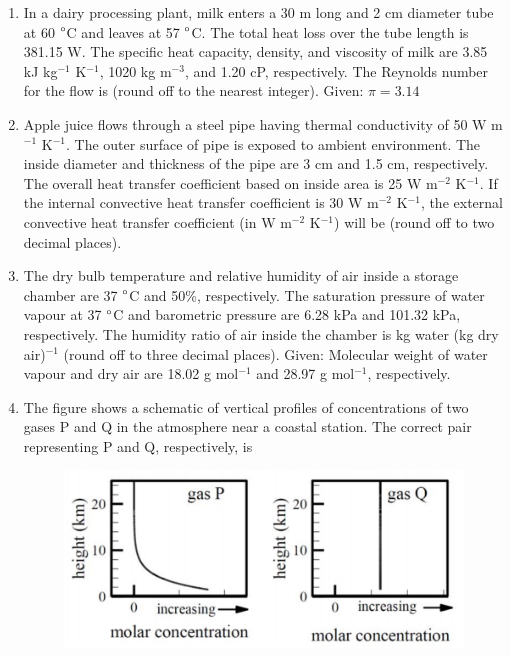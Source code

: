 \documentclass[a4paper,10pt]{article}
\begin{document}
\begin{enumerate}
\item In a dairy processing plant, milk enters a 30 m long and 2 cm diameter tube at 60 $\degree$C and leaves at 57 $\degree$C. The total heat loss over the tube length is 381.15 W. The specific heat capacity, density, and viscosity of milk are 3.85 kJ kg$^{-1}$ K$^{-1}$, 1020 kg m$^{-3}$, and 1.20 cP, respectively. The Reynolds number for the flow is \underline{\hspace{2cm}} (round off to the nearest integer). Given: $\pi = 3.14$

\hfill{}

\item Apple juice flows through a steel pipe having thermal conductivity of 50 W m$^{-1}$ K$^{-1}$. The outer surface of pipe is exposed to ambient environment. The inside diameter and thickness of the pipe are 3 cm and 1.5 cm, respectively. The overall heat transfer coefficient based on inside area is 25 W m$^{-2}$ K$^{-1}$. If the internal convective heat transfer coefficient is 30 W m$^{-2}$ K$^{-1}$, the external convective heat transfer coefficient (in W m$^{-2}$ K$^{-1}$) will be \underline{\hspace{2cm}} (round off to two decimal places).

\hfill{}

\item The dry bulb temperature and relative humidity of air inside a storage chamber are 37 $\degree$C and 50\%, respectively. The saturation pressure of water vapour at 37 $\degree$C and barometric pressure are 6.28 kPa and 101.32 kPa, respectively. The humidity ratio of air inside the chamber is \underline{\hspace{2cm}} kg water (kg dry air)$^{-1}$ (round off to three decimal places). Given: Molecular weight of water vapour and dry air are 18.02 g mol$^{-1}$ and 28.97 g mol$^{-1}$, respectively.

\hfill{}

\item The figure shows a schematic of vertical profiles of concentrations of two gases P and Q in the atmosphere near a coastal station. The correct pair representing P and Q, respectively, is
\begin{figure}[H]
    \centering
    \includegraphics[width=0.7\columnwidth]{q154.png}
    \caption*{}
    \label{fig:q154}
\end{figure}


\end{enumerate}
\end{document}
